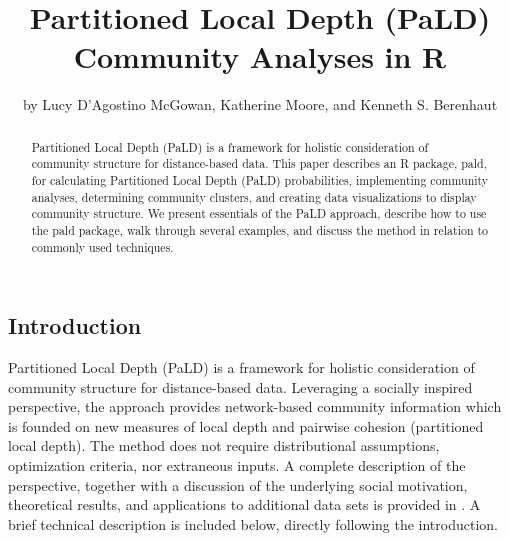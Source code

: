 \title{Partitioned Local Depth (PaLD) Community Analyses in R}

\author{by Lucy D'Agostino McGowan, Katherine Moore, and Kenneth S. Berenhaut}

\maketitle

\begin{abstract}%
Partitioned Local Depth (PaLD) is a framework for holistic consideration of community structure for distance-based data. This paper describes an R package, pald, for calculating Partitioned Local Depth (PaLD) probabilities, implementing community analyses, determining community clusters, and creating data visualizations to display community structure. We present essentials of the PaLD approach, describe how to use the pald package, walk through several examples, and discuss the method in relation to commonly used techniques.
\end{abstract}

\hypertarget{introduction}{%
\subsection{Introduction}\label{introduction}}

Partitioned Local Depth (PaLD) is a framework for holistic
consideration of community structure for distance-based data. Leveraging
a socially inspired perspective, the approach provides network-based
community information which is founded on new measures of local depth
and pairwise cohesion (partitioned local depth). The method does not
require distributional assumptions, optimization criteria, nor
extraneous inputs. A complete description of the perspective, together
with a discussion of the underlying social motivation, theoretical
results, and applications to additional data sets is provided in \citet{berenhaut2022social}. A brief technical description is included below, directly following the introduction.

